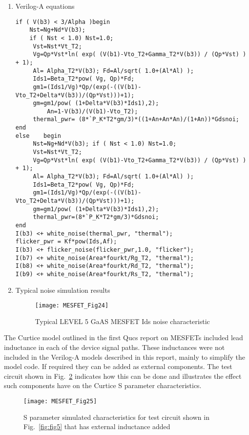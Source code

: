\begin{enumerate}
 \item Verilog-A equations
\begin{verbatim}
if ( V(b3) < 3/Alpha )begin
	Nst=Ng+Nd*V(b3);
	if ( Nst < 1.0) Nst=1.0;
	 Vst=Nst*Vt_T2;
	 Vg=Qp*Vst*ln( exp( (V(b1)-Vto_T2+Gamma_T2*V(b3)) / (Qp*Vst) ) + 1);
	 Al= Alpha_T2*V(b3); Fd=Al/sqrt( 1.0+(Al*Al) );
	 Ids1=Beta_T2*pow( Vg, Qp)*Fd;
	 gm1=(Ids1/Vg)*Qp/(exp(-((V(b1)-Vto_T2+Delta*V(b3))/(Qp*Vst)))+1);
	 gm=gm1/pow( (1+Delta*V(b3)*Ids1),2); 
         An=1-V(b3)/(V(b1)-Vto_T2);
 	 thermal_pwr= (8*`P_K*T2*gm/3)*((1+An+An*An)/(1+An))*Gdsnoi;
end
else	begin
	 Nst=Ng+Nd*V(b3); if ( Nst < 1.0) Nst=1.0;
	 Vst=Nst*Vt_T2;
	 Vg=Qp*Vst*ln( exp( (V(b1)-Vto_T2+Gamma_T2*V(b3)) / (Qp*Vst) ) + 1);
	 Al= Alpha_T2*V(b3); Fd=Al/sqrt( 1.0+(Al*Al) );
	 Ids1=Beta_T2*pow( Vg, Qp)*Fd;
	 gm1=(Ids1/Vg)*Qp/(exp(-((V(b1)-Vto_T2+Delta*V(b3))/(Qp*Vst)))+1);
	 gm=gm1/pow( (1+Delta*V(b3)*Ids1),2);
	 thermal_pwr=(8*`P_K*T2*gm/3)*Gdsnoi;
end
I(b3) <+ white_noise(thermal_pwr, "thermal"); 
flicker_pwr = Kf*pow(Ids,Af);
I(b3) <+ flicker_noise(flicker_pwr,1.0, "flicker");
I(b7) <+ white_noise(Area*fourkt/Rg_T2, "thermal");
I(b8) <+ white_noise(Area*fourkt/Rd_T2, "thermal");
I(b9) <+ white_noise(Area*fourkt/Rs_T2, "thermal"); 
\end{verbatim} 

\item Typical noise simulation results
\begin{figure} [h]
  \centering
  \texttt{[image: MESFET\_Fig24]}  
  \caption{Typical LEVEL 5 GaAS MESFET Ids noise characteristic}  
  \label{fig:fig24} 
\end{figure} 

\end{enumerate}


The Curtice model outlined in the first Qucs report on MESFETs
included lead inductance in each of the device signal paths. These
inductances were not included in the Verilog-A models described in
this report, mainly to simplify the model code.  If required they can
be added as external components.  The test circuit shown in
Fig.~\ref{fig:fig25} indicates how this can be done and illustrates
the effect such components have on the Curtice S parameter
characteristics.

\begin{figure}  
  \centering
  \texttt{[image: MESFET\_Fig25]}  
  \caption{S parameter simulated characteristics for test circuit shown in Fig.~\ref{fig:fig5} that has external inductance added}  
  \label{fig:fig25} 
\end{figure} 


